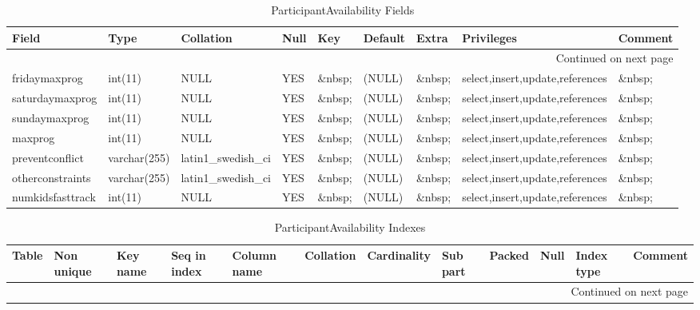 \documentclass[tablesignature]{scrartcl}
\begin{document}
\begin{longtable}{|l|l|l|l|l|l|l|l|l|}
\caption{ParticipantAvailability Fields} \label{tbl:participantavailabilityfields}\\
\hline
 Field             &  Type          &  Collation                &  Null     &  Key      &  Default  &  Extra    &  Privileges                       &  Comment \\
\hline
\endhead
\hline\multicolumn{9}{r}{Continued on next page}\
\endfoot
\endlastfoot
\hline
 badgeid           &  varchar(15)   &  latin1\_{}swedish\_{}ci  &  \&nbsp;  &  PRI      &  \&nbsp;  &  \&nbsp;  &  select,insert,update,references  &  \&nbsp;  \\
 fridaymaxprog     &  int(11)       &  NULL                     &  YES      &  \&nbsp;  &  (NULL)   &  \&nbsp;  &  select,insert,update,references  &  \&nbsp;  \\
 saturdaymaxprog   &  int(11)       &  NULL                     &  YES      &  \&nbsp;  &  (NULL)   &  \&nbsp;  &  select,insert,update,references  &  \&nbsp;  \\
 sundaymaxprog     &  int(11)       &  NULL                     &  YES      &  \&nbsp;  &  (NULL)   &  \&nbsp;  &  select,insert,update,references  &  \&nbsp;  \\
 maxprog           &  int(11)       &  NULL                     &  YES      &  \&nbsp;  &  (NULL)   &  \&nbsp;  &  select,insert,update,references  &  \&nbsp;  \\
 preventconflict   &  varchar(255)  &  latin1\_{}swedish\_{}ci  &  YES      &  \&nbsp;  &  (NULL)   &  \&nbsp;  &  select,insert,update,references  &  \&nbsp;  \\
 otherconstraints  &  varchar(255)  &  latin1\_{}swedish\_{}ci  &  YES      &  \&nbsp;  &  (NULL)   &  \&nbsp;  &  select,insert,update,references  &  \&nbsp;  \\
 numkidsfasttrack  &  int(11)       &  NULL                     &  YES      &  \&nbsp;  &  (NULL)   &  \&nbsp;  &  select,insert,update,references  &  \&nbsp;  \\
\hline
\end{longtable}


\begin{longtable}{|l|l|l|l|l|l|l|l|l|l|l|l|}
\caption{ParticipantAvailability Indexes} \label{tbl:participantavailabilityindexes}\\
\hline
 Table                    &  Non unique  &  Key name  &  Seq in index  &  Column name  &  Collation  &  Cardinality  &  Sub part  &  Packed  &  Null     &  Index type  &  Comment \\
\hline
\endhead
\hline\multicolumn{12}{r}{Continued on next page}\
\endfoot
\endlastfoot
\hline
 ParticipantAvailability  &           0  &  PRIMARY   &             1  &  badgeid      &  A          &            2  &  (NULL)    &  (NULL)  &  \&nbsp;  &  BTREE       &  \&nbsp;  \\
\hline
\end{longtable}
\end{document}
